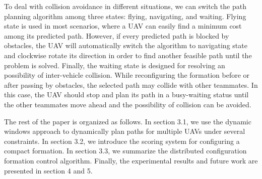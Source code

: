 To deal with collision avoidance in different situations, we can switch the path planning algorithm among three states: flying, navigating, and waiting. Flying state is used in most scenarios, where a UAV can easily find a minimum cost among its predicted path. However, if every predicted path is blocked by obstacles, the UAV will automatically switch the algorithm to navigating state and clockwise rotate its direction in order to find another feasible path until the problem is solved. Finally, the waiting state is designed for resolving an possibility of inter-vehicle collision. While reconfiguring the formation before or after passing by obstacles, the selected path may collide with other teammates. In this case, the UAV should stop and plan its path in a busy-waiting status until the other teammates move ahead and the possibility of collision can be avoided.

The rest of the paper is organized as follows. In section 3.1, we use the dynamic windows approach \citep{580977} to dynamically plan paths for multiple UAVs under several constraints. In section 3.2, we introduce the scoring system for configuring a compact formation. In section 3.3, we summarize the distributed configuration formation control algorithm. Finally, the experimental results and future work are presented in section 4 and 5.
